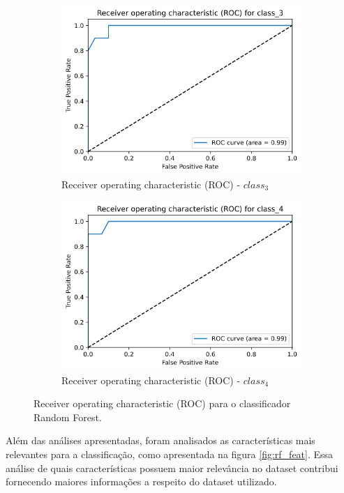 \documentclass[
	article,			%
	11pt,				%
	oneside,			%
	a4paper,			%
	english,			%
	brazil,				%
	sumario=tradicional
	]{abntex2}
\begin{document}
\begin{figure}[H]
\begin{subfigure}[b]{0.475\textwidth}
    \includegraphics[scale=0.375]{fig/rf_roc3.png}
    \caption{Receiver operating characteristic (ROC) - $class_3$}
    \label{fig:rf_roc3}
    \end{subfigure}
    \hfill
    \begin{subfigure}[b]{0.475\textwidth}
    \centering
    \includegraphics[scale=0.375]{fig/rf_roc4.png}
    \caption{Receiver operating characteristic (ROC) - $class_4$}
    \label{fig:rf_roc4}
    \end{subfigure}
    \caption{Receiver operating characteristic (ROC) para o classificador Random Forest.}
    \label{rf_roc}
\end{figure}

Além das análises apresentadas, foram analisados as características mais relevantes para a classificação, como apresentada na figura \ref{fig:rf_feat}. Essa análise de quais características possuem maior relevância no dataset contribui fornecendo maiores informações a respeito do dataset utilizado.
\end{document}
